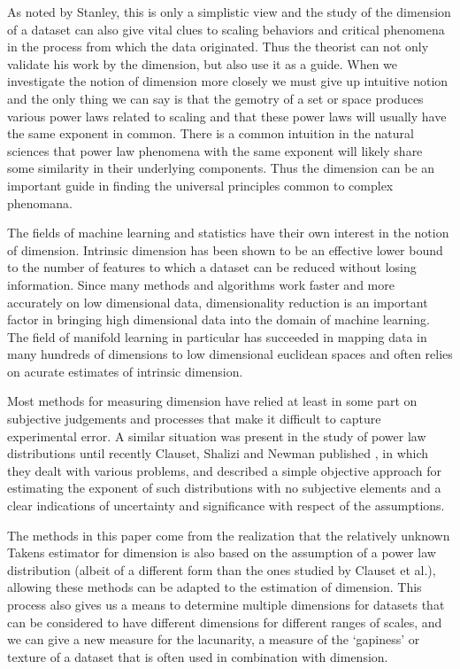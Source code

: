 \documentclass[11pt]{article}
\begin{document}
As noted by Stanley, this is only a simplistic view and the study of the dimension of a dataset can also give vital clues to scaling behaviors and critical phenomena in the process from which the data originated. Thus the theorist can not only validate his work by the dimension, but also use it as a guide. When we investigate the notion of dimension more closely we must give up intuitive notion and the only thing we can say is that the gemotry of a set or space produces various power laws related to scaling and that these power laws will usually have the same exponent in common. There is a common intuition in the natural sciences that power law phenomena with the same exponent will likely share some similarity in their underlying components. Thus the dimension can be an important guide in finding the universal principles common to  complex phenomana.

The fields of machine learning and statistics have their own interest in the notion of dimension. Intrinsic dimension has been shown to be an effective lower bound to the number of features to which a dataset can be reduced without losing information.\cite{kumaraswamy2008fractal} Since many methods and algorithms work faster and more accurately on low dimensional data, dimensionality reduction is an important factor in bringing high dimensional data into the domain of machine learning. The field of manifold learning in particular has succeeded in mapping data in many hundreds of dimensions to low dimensional euclidean spaces\cite{roweis2000nonlinear} and often relies on acurate estimates of intrinsic dimension.\cite{levina2004maximum} 

Most methods for measuring dimension have relied at least in some part on subjective judgements and processes that make it difficult to capture experimental error. A similar situation was present in the study of power law distributions until recently Clauset, Shalizi and Newman published \cite{clauset2007power}, in which they dealt with various problems, and described a simple objective approach for estimating the exponent of such distributions with no subjective elements and a clear indications of uncertainty and significance with respect of the assumptions.

The methods in this paper come from the realization that the relatively unknown Takens estimator for dimension is also based on the assumption of a power law distribution (albeit of a different form than the ones studied by Clauset et al.), allowing these methods can be adapted to the estimation of dimension. This process also gives us a means to determine multiple dimensions for datasets that can be considered to have different dimensions for different ranges of scales, and we can give a new measure for the lacunarity, a measure of the `gapiness' or texture of a dataset that is often used in combination with dimension. 
\end{document}
